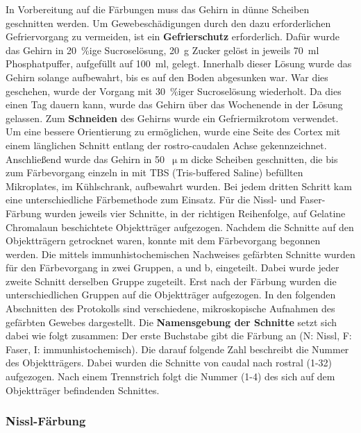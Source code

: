 \documentclass[12pt,a4paper,pdftex]{article}
\begin{document}
In Vorbereitung auf die Färbungen muss das Gehirn in dünne Scheiben geschnitten werden. Um Gewebeschädigungen durch den dazu erforderlichen Gefriervorgang zu vermeiden, ist ein \textbf{Gefrierschutz} erforderlich. Dafür wurde das Gehirn in 20~\%ige Sucroselösung, 20~g Zucker gelöst in jeweils 70~ml Phosphatpuffer, aufgefüllt auf 100~ml, gelegt. Innerhalb dieser Lösung wurde das Gehirn solange aufbewahrt, bis es auf den Boden abgesunken war. War dies geschehen, wurde der Vorgang mit 30~\%iger Sucroselösung wiederholt. Da dies einen Tag dauern kann, wurde das Gehirn über das Wochenende in der Lösung gelassen. Zum \textbf{Schneiden} des Gehirns wurde ein Gefriermikrotom verwendet. Um eine bessere Orientierung zu ermöglichen, wurde eine Seite des Cortex mit einem länglichen Schnitt entlang der rostro-caudalen Achse gekennzeichnet. Anschließend wurde das Gehirn in 50~$\upmu$m dicke Scheiben geschnitten, die bis zum Färbevorgang einzeln in mit TBS (Tris-buffered Saline) befüllten Mikroplates, im Kühlschrank, aufbewahrt wurden. Bei jedem dritten Schritt kam eine unterschiedliche Färbemethode zum Einsatz. Für die Nissl- und Faser-Färbung wurden jeweils vier Schnitte, in der richtigen Reihenfolge, auf Gelatine Chromalaun beschichtete Objektträger aufgezogen. Nachdem die Schnitte auf den Objektträgern getrocknet waren, konnte mit dem Färbevorgang begonnen werden. Die mittels immunhistochemischen Nachweises gefärbten Schnitte wurden für den Färbevorgang in zwei Gruppen, a und b, eingeteilt. Dabei wurde jeder zweite Schnitt derselben Gruppe zugeteilt. Erst nach der Färbung wurden die unterschiedlichen Gruppen auf die Objektträger aufgezogen. In den folgenden Abschnitten des Protokolls sind verschiedene, mikroskopische Aufnahmen des gefärbten Gewebes dargestellt. Die \textbf{Namensgebung der Schnitte} setzt sich dabei wie folgt zusammen: Der erste Buchstabe gibt die Färbung an (N: Nissl, F: Faser, I: immunhistochemisch). Die darauf folgende Zahl beschreibt die Nummer des Objektträgers. Dabei wurden die Schnitte von caudal nach rostral (1-32) aufgezogen. Nach einem Trennstrich folgt die Nummer (1-4) des sich auf dem Objektträger befindenden Schnittes.

\subsubsection{Nissl-Färbung}
\end{document}
